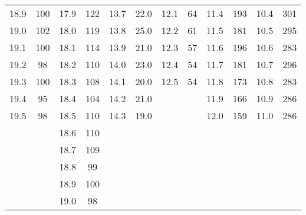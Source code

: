\begin{table}[H]
\begin{tabular}{c c c c c c c c c c c c}
    \num{18.9} & \num{100} &\num{17.9} & \num{122} & \num{13.7}  & \num{22.0} & \num{12.1} & \num{64} & \num{11.4} & \num{193} & \num{10.4} & \num{301} \\
    \num{19.0} & \num{102} &\num{18.0} & \num{119} & \num{13.8}  & \num{25.0} & \num{12.2} & \num{61} & \num{11.5} & \num{181} & \num{10.5} & \num{295} \\
    \num{19.1} & \num{100} &\num{18.1} & \num{114} & \num{13.9}  & \num{21.0} & \num{12.3} & \num{57} & \num{11.6} & \num{196} & \num{10.6} & \num{283} \\
    \num{19.2} & \num{98}  &\num{18.2} & \num{110} & \num{14.0}  & \num{23.0} & \num{12.4} & \num{54} & \num{11.7} & \num{181} & \num{10.7} & \num{296} \\
    \num{19.3} & \num{100} &\num{18.3} & \num{108} & \num{14.1}  & \num{20.0} & \num{12.5} & \num{54} & \num{11.8} & \num{173} & \num{10.8} & \num{283} \\
    \num{19.4} & \num{95}  &\num{18.4} & \num{104} & \num{14.2}  & \num{21.0} &            &          & \num{11.9} & \num{166} & \num{10.9} & \num{286} \\
    \num{19.5} & \num{98}  &\num{18.5} & \num{110} & \num{14.3}  & \num{19.0} &            &          & \num{12.0} & \num{159} & \num{11.0} & \num{286} \\
               &           &\num{18.6} & \num{110} &             &            &            &          &            &           &            &           \\
               &           &\num{18.7} & \num{109} &             &            &            &          &            &           &            &           \\
               &           &\num{18.8} & \num{99}  &             &            &            &          &            &           &            &           \\
               &           &\num{18.9} & \num{100} &             &            &            &          &            &           &            &           \\
               &           &\num{19.0} & \num{98}  &             &            &            &          &            &           &            &           \\
    \bottomrule
    \end{tabular}
  \end{table}
